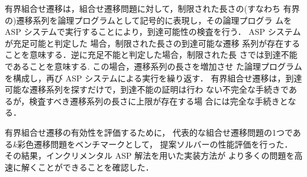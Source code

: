 有界組合せ遷移は，組合せ遷移問題に対して，制限された長さの(すなわち
有界の)遷移系列を論理プログラムとして記号的に表現し，その論理プログラ
ムを ASP システムで実行することにより，到達可能性の検査を行う．
ASP システムが充足可能と判定した 場合，制限された長さの到達可能な遷移
系列が存在することを意味する．逆に充足不能と判定した場合，制限された長
さでは到達不能であることを意味する. この場合，遷移系列の長さを増加させ
た論理プログラムを構成し，再び ASP システムによる実行を繰り返す．
有界組合せ遷移は，到達可能な遷移系列を探すだけで，到達不能の証明は行わ
ない不完全な手続きであるが，検査すべき遷移系列の長さに上限が存在する場
合には完全な手続きとなる．

有界組合せ遷移の有効性を評価するために，
代表的な組合せ遷移問題の1つである$k$彩色遷移問題をベンチマークとして，
提案ソルバーの性能評価を行った．
その結果，インクリメンタル ASP 解法を用いた実装方法が
より多くの問題を高速に解くことができることを確認した．


